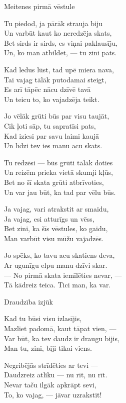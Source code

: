 \documentclass[14pt]{extarticle}
\begin{document}
{{\newpage

{\large \sc Meitenes pirmā vēstule}

Tu piedod, ja pārāk strauja biju\\
Un varbūt kaut ko neredzēja skats,\\
Bet sirds ir sirds, es viņai paklausīju,\\
Un, ko man atbildēt, --- tu zini pats.

Kad ledus lūst, tad upē miera nava,\\
Tai vajag tālāk putodamai steigt,\\
Es arī tāpēc nācu dzīvē tavā\\
Un teicu to, ko vajadzēja teikt. 

Jo vēlāk grūti būs par visu taujāt,\\
Cik ļoti sāp, tu sapratīsi pats,\\
Kad iziesi par savu laimi kaujā\\
Un līdzi tev ies manu acu skats.

Tu redzēsi --- būs grūti tālāk doties\\
Un reizēm prieka vietā skumji kļūs,\\
Bet no šī skata grūti atbrīvoties,\\
Un var jau būt, ka tad par vēlu būs. 

Ja vajag, vari atrakstit ar smaidu,\\
Ja vajag, esi atturīgs un vēss,\\
Bet zini, ka šīs vēstules, ko gaidu,\\
Man varbūt visu mūžu vajadzēs. 

Jo spēks, ko tavu acu skatiens deva,\\
Ar ugunīgu elpu manu dzīvi skar.\\
--- No pirmā skata iemīlēties nevar, ---\\
Tā kādreiz teica. Tici man, ka var.


\newpage

{\large \sc Draudzība izjūk}

Kad tu būsi visu izlasījis,\\
Mazliet padomā, kaut tāpat vien, ---\\
Var būt, ka tev daudz ir draugu bijis,\\
Man tu, zini, biji tikai viens. 

Negribējās strīdēties ar tevi ---\\
Daudzreiz atliku --- nu rīt, nu rīt.\\
Nevar taču ilgāk apkrāpt sevi,\\
To, ko vajag, --- jāvar uzrakstīt!

}}
\end{document}
